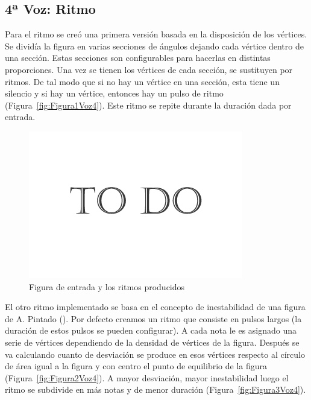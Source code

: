 
\subsection{4ª Voz: Ritmo}

Para el ritmo se creó una primera versión basada en la disposición de los vértices. Se dividía la figura en varias secciones de ángulos dejando cada vértice dentro de una sección. Estas secciones son configurables para hacerlas en distintas proporciones. Una vez se tienen los vértices de cada sección, se sustituyen por ritmos. De tal modo que si no hay un vértice en una sección, esta tiene un silencio y si hay un vértice, entonces hay un pulso de ritmo (Figura~\ref{fig:Figura1Voz4}). Este ritmo se repite durante la duración dada por entrada.

		\begin{figure}[htbp]
		\centering
		\hspace*{0.0in}
		\includegraphics[scale=0.57]{graphics/todo.png}
		\caption{Figura de entrada y los ritmos producidos}
		\label{fig:Figur1Voz4}
		\end{figure}

El otro ritmo implementado se basa en el concepto de inestabilidad de una figura de A. Pintado (\cite{portutesis}). Por defecto creamos un ritmo que consiste en pulsos largos (la duración de estos pulsos se pueden configurar). A cada nota le es asignado una serie de vértices dependiendo de la densidad de vértices de la figura. Después se va calculando cuanto de desviación se produce en esos vértices respecto al círculo de área igual a la figura y con centro el punto de equilibrio de la figura (Figura~\ref{fig:Figura2Voz4}). A mayor desviación, mayor inestabilidad luego el ritmo se subdivide en más notas y de menor duración (Figura~\ref{fig:Figura3Voz4}).

